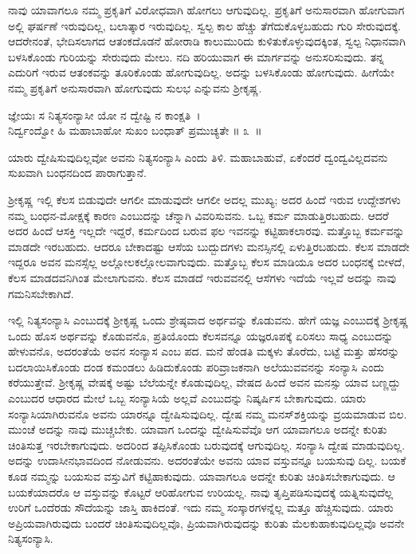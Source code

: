 ನಾವು ಯಾವಾಗಲೂ ನಮ್ಮ ಪ್ರಕೃತಿಗೆ ವಿರೋಧವಾಗಿ ಹೋಗಲು ಆಗುವುದಿಲ್ಲ. ಪ್ರಕೃತಿಗೆ ಅನುಸಾರವಾಗಿ ಹೋಗುವಾಗ ಅಲ್ಲಿ ಘರ್ಷಣೆ ಇರುವುದಿಲ್ಲ, ಬಲಾತ್ಕಾರ ಇರುವುದಿಲ್ಲ. ಸ್ವಲ್ಪ ಕಾಲ ಹೆಚ್ಚು ತೆಗೆದುಕೊಳ್ಳಬಹುದು ಗುರಿ ಸೇರುವುದಕ್ಕೆ. ಆದರೇನಂತೆ, ಭೇದಿಸಲಾಗದ ಆತಂಕದೊಡನೆ ಹೋರಾಡಿ ಕಾಲುಮುರಿದು ಕುಳಿತುಕೊಳ್ಳುವುದಕ್ಕಿಂತ, ಸ್ವಲ್ಪ ನಿಧಾನವಾಗಿ ಬಳಸಿಕೊಂಡು ಗುರಿಯನ್ನು ಸೇರುವುದು ಮೇಲು. ನದಿ ಹರಿಯುವಾಗ ಈ ಮಾರ್ಗವನ್ನು ಅನುಸರಿಸುವುದು. ತನ್ನ ಎದುರಿಗೆ ಇರುವ ಆತಂಕವನ್ನು ತೂರಿಕೊಂಡು ಹೋಗುವುದಿಲ್ಲ. ಅದನ್ನು ಬಳಸಿಕೊಂಡು ಹೋಗುವುದು. ಹೀಗೆಯೇ ನಮ್ಮ ಪ್ರಕೃತಿಗೆ ಅನುಸಾರವಾಗಿ ಹೋಗುವುದು ಸುಲಭ ಎನ್ನುವನು ಶ‍್ರೀಕೃಷ್ಣ.

\begin{shloka}
ಜ್ಞೇಯಃ ಸ ನಿತ್ಯಸಂನ್ಯಾಸೀ ಯೋ ನ ದ್ವೇಷ್ಟಿ ನ ಕಾಂಕ್ಷತಿ~।\\ನಿರ್ದ್ವಂದ್ವೋ ಹಿ ಮಹಾಬಾಹೋ ಸುಖಂ ಬಂಧಾತ್ ಪ್ರಮುಚ್ಯತೇ \hfill॥ ೩~॥
\end{shloka}

\begin{artha}
ಯಾರು ದ್ವೇಷಿಸುವುದಿಲ್ಲವೋ ಅವನು ನಿತ್ಯಸಂನ್ಯಾಸಿ ಎಂದು ತಿಳಿ. ಮಹಾಬಾಹುವೆ, ಏಕೆಂದರೆ ದ್ವಂದ್ವವಿಲ್ಲದವನು ಸುಖವಾಗಿ ಬಂಧನದಿಂದ ಪಾರಾಗುತ್ತಾನೆ.
\end{artha}

ಶ‍್ರೀಕೃಷ್ಣ ಇಲ್ಲಿ ಕೆಲಸ ಬಿಡುವುದೇ ಆಗಲೀ ಮಾಡುವುದೇ ಆಗಲೀ ಅದಲ್ಲ ಮುಖ್ಯ; ಅದರ ಹಿಂದೆ ಇರುವ ಉದ್ದೇಶಗಳು ನಮ್ಮ ಬಂಧನ-ಮೋಕ್ಷಕ್ಕೆ ಕಾರಣ ಎಂಬುದನ್ನು ಚೆನ್ನಾಗಿ ವಿವರಿಸುವನು. ಒಬ್ಬ ಕರ್ಮ ಮಾಡುತ್ತಿರಬಹುದು. ಆದರೆ ಅದರ ಹಿಂದೆ ಆಸಕ್ತಿ ಇಲ್ಲದೇ ಇದ್ದರೆ, ಕರ್ಮದಿಂದ ಬರುವ ಫಲ ಇವನನ್ನು ಕಟ್ಟಿಹಾಕಲಾರವು. ಮತ್ತೊಬ್ಬ ಕರ್ಮವನ್ನು ಮಾಡದೇ ಇರಬಹುದು. ಆದರೂ ಬೇಕಾದಷ್ಟು ಆಸೆಯ ಬುದ್ಬುದಗಳು ಮನಸ್ಸಿನಲ್ಲಿ ಏಳುತ್ತಿರಬಹುದು. ಕೆಲಸ ಮಾಡದೇ ಇದ್ದರೂ ಅವನ ಮನಸ್ಸೆಲ್ಲ ಅಲ್ಲೋಲಕಲ್ಲೋಲವಾಗುವುದು. ಮತ್ತೊಬ್ಬ ಕೆಲಸ ಮಾಡಿಯೂ ಅದರ ಬಂಧನಕ್ಕೆ ಬೀಳದೆ, ಕೆಲಸ ಮಾಡದವನಿಗಿಂತ ಮೇಲಾಗುವನು. ಕೆಲಸ ಮಾಡದೆ ಇರುವವನಲ್ಲಿ ಆಸೆಗಳು ಇದೆಯೆ ಇಲ್ಲವೆ ಅದನ್ನು ನಾವು ಗಮನಿಸಬೇಕಾಗಿದೆ.

ಇಲ್ಲಿ ನಿತ್ಯಸಂನ್ಯಾಸಿ ಎಂಬುದಕ್ಕೆ ಶ‍್ರೀಕೃಷ್ಣ ಒಂದು ಶ್ರೇಷ್ಠವಾದ ಅರ್ಥವನ್ನು ಕೊಡುವನು. ಹೇಗೆ ಯಜ್ಞ ಎಂಬುದಕ್ಕೆ ಶ‍್ರೀಕೃಷ್ಣ ಒಂದು ಹೊಸ ಅರ್ಥವನ್ನು ಕೊಡುವನೊ, ಪ್ರತಿಯೊಂದು ಕೆಲಸವನ್ನೂ ಯಜ್ಞರೂಪಕ್ಕೆ ಏರಿಸಲು ಸಾಧ್ಯ ಎಂಬುದನ್ನು ಹೇಳುವನೊ, ಅದರಂತೆಯೆ ಅವನ ಸಂನ್ಯಾಸ ಎಂಬ ಪದ. ಮನೆ ಹೆಂಡತಿ ಮಕ್ಕಳು ತೊರೆದು, ಬಟ್ಟೆ ಮತ್ತು ಹೆಸರನ್ನು ಬದಲಾಯಿಸಿಕೊಂಡು ದಂಡ ಕಮಂಡಲು ಹಿಡಿದುಕೊಂಡು ಪರಿವ್ರಾಜಕನಾಗಿ ಅಲೆಯುವವನನ್ನು ಸಂನ್ಯಾಸಿ ಎಂದು ಕರೆಯುತ್ತೇವೆ. ಶ‍್ರೀಕೃಷ್ಣ ವೇಷಕ್ಕೆ ಅಷ್ಟು ಬೆಲೆಯನ್ನೇ ಕೊಡುವುದಿಲ್ಲ, ವೇಷದ ಹಿಂದೆ ಅವನ ಮನಸ್ಸು ಯಾವ ಬಣ್ಣದ್ದು ಎಂಬುದರ ಆಧಾರದ ಮೇಲೆ ಒಬ್ಬ ಸಂನ್ಯಾಸಿಯೆ ಅಲ್ಲವೆ ಎಂಬುದನ್ನು ನಿಷ್ಕರ್ಷಿಸ ಬೇಕಾಗುವುದು. ಯಾರು ಸಂನ್ಯಾಸಿಯಾಗಿರುವನೊ ಅವನು ಯಾರನ್ನೂ ದ್ವೇಷಿಸುವುದಿಲ್ಲ. ದ್ವೇಷ ನಮ್ಮ ಮನಸ್​ಶಕ್ತಿಯನ್ನು ವ್ರಯಮಾಡುವ ಬಿಲ. ಮುಂಚೆ ಅದನ್ನು ನಾವು ಮುಚ್ಚಬೇಕು. ಯಾವಾಗ ಒಂದನ್ನು ದ್ವೇಷಿಸುವೆವೊ ಆಗ ಯಾವಾಗಲೂ ಅದನ್ನೇ ಕುರಿತು ಚಿಂತಿಸುತ್ತ ಇರಬೇಕಾಗುವುದು. ಅದರಿಂದ ತಪ್ಪಿಸಿಕೊಂಡು ಬರುವುದಕ್ಕೆ ಆಗುವುದಿಲ್ಲ. ಸಂನ್ಯಾಸಿ ದ್ವೇಷ ಮಾಡುವುದಿಲ್ಲ. ಅದನ್ನು ಉದಾಸೀನಭಾವದಿಂದ ನೋಡುವನು. ಅದರಂತೆಯೇ ಅವನು ಯಾವ ವಸ್ತುವನ್ನೂ ಬಯಸುವು ದಿಲ್ಲ. ಬಯಕೆ ಕೂಡ ನಮ್ಮನ್ನು ಬಯಸುವ ವಸ್ತುವಿಗೆ ಕಟ್ಟಿಹಾಕುವುದು. ಯಾವಾಗಲೂ ಅದನ್ನೇ ಕುರಿತು ಚಿಂತಿಸಬೇಕಾಗುವುದು. ಆ ಬಯಕೆಯಾದರೊ ಆ ವಸ್ತುವನ್ನು ಕೊಟ್ಟರೆ ಆರಿಹೋಗುವ ಉರಿಯಲ್ಲ. ನಾವು ತೃಪ್ತಿಪಡಿಸುವುದಕ್ಕೆ ಯತ್ನಿಸುವುದೆಲ್ಲ ಉರಿಗೆ ಒಂದೆರಡು ಸೌದೆಯನ್ನು ಜಾಸ್ತಿ ಹಾಕಿದಂತೆ. ಇದು ನಮ್ಮ ಸಂಸ್ಕಾರಗಳನ್ನೆಲ್ಲ ಮತ್ತೂ ಹೆಚ್ಚಿಸುವುದು. ಯಾರು ಅಪ್ರಿಯವಾಗಿರುವುದು ಬಂದರೆ ಚಿಂತಿಸುವುದಿಲ್ಲವೊ, ಪ್ರಿಯವಾಗಿರುವುದನ್ನು ಕುರಿತು ಮೆಲಕುಹಾಕುವುದಿಲ್ಲವೊ ಅವನೇ ನಿತ್ಯಸಂನ್ಯಾಸಿ.

